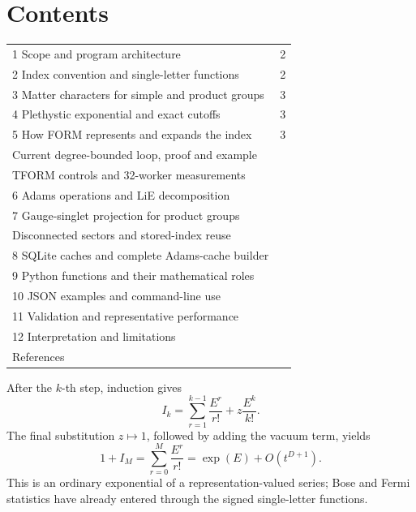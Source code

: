 \documentclass[11pt,a4paper]{article}
\begin{document}
\section*{Contents}
\begin{tabularx}{\textwidth}{@{}Yr@{}}
1 Scope and program architecture & 2\\
2 Index convention and single-letter functions & 2\\
3 Matter characters for simple and product groups & 3\\
4 Plethystic exponential and exact cutoffs & 3\\
5 How FORM represents and expands the index & 3\\
\quad Current degree-bounded loop, proof and example & \pageref{sec:degree-bounded}\\
\quad TFORM controls and 32-worker measurements & \pageref{sec:tform-runtime}\\
6 Adams operations and LiE decomposition & \pageref{sec:adams}\\
7 Gauge-singlet projection for product groups & \pageref{sec:projection}\\
\quad Disconnected sectors and stored-index reuse & \pageref{sec:disconnected}\\
8 SQLite caches and complete Adams-cache builder & \pageref{sec:cache}\\
9 Python functions and their mathematical roles & \pageref{sec:functions}\\
10 JSON examples and command-line use & \pageref{sec:json}\\
11 Validation and representative performance & \pageref{sec:validation}\\
12 Interpretation and limitations & \pageref{sec:limits}\\
References & \pageref{sec:refs}\\
\end{tabularx}
\clearpage

\setcounter{section}{5}\setcounter{subsection}{3}\setcounter{equation}{18}
After the $k$-th step, induction gives
\begin{equation}
 I_k=\sum_{r=1}^{k-1}\frac{E^r}{r!}+z\frac{E^k}{k!}.
\end{equation}
The final substitution $z\mapsto1$, followed by adding the vacuum term, yields
\begin{equation}
 1+I_M=\sum_{r=0}^{M}\frac{E^r}{r!}=\exp(E)+O(t^{D+1}).
\end{equation}
This is an ordinary exponential of a representation-valued series; Bose and Fermi
statistics have already entered through the signed single-letter functions.
\end{document}
